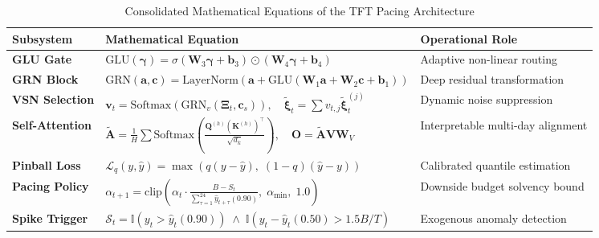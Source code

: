 \documentclass[11pt,a4paper]{article}
\begin{document}
\begin{table}[h!]
\centering
\caption{Consolidated Mathematical Equations of the TFT Pacing Architecture}
\label{tab:consolidated_eqs}
\small
\begin{tabular}{lll}
\toprule
\textbf{Subsystem} & \textbf{Mathematical Equation} & \textbf{Operational Role} \\
\midrule
\textbf{GLU Gate} & $\mathrm{GLU}(\boldsymbol{\gamma}) = \sigma(\mathbf{W}_3 \boldsymbol{\gamma} + \mathbf{b}_3) \odot (\mathbf{W}_4 \boldsymbol{\gamma} + \mathbf{b}_4)$ & Adaptive non-linear routing \\
\textbf{GRN Block} & $\mathrm{GRN}(\mathbf{a}, \mathbf{c}) = \mathrm{LayerNorm}(\mathbf{a} + \mathrm{GLU}(\mathbf{W}_1\mathbf{a} + \mathbf{W}_2\mathbf{c} + \mathbf{b}_1))$ & Deep residual transformation \\
\textbf{VSN Selection} & $\mathbf{v}_t = \mathrm{Softmax}(\mathrm{GRN}_v(\mathbf{\Xi}_t, \mathbf{c}_s)), \quad \tilde{\boldsymbol{\xi}}_t = \sum v_{t, j} \tilde{\boldsymbol{\xi}}_t^{(j)}$ & Dynamic noise suppression \\
\textbf{Self-Attention} & $\tilde{\mathbf{A}} = \frac{1}{H}\sum \mathrm{Softmax}\left(\frac{\mathbf{Q}^{(h)} (\mathbf{K}^{(h)})^\top}{\sqrt{d_k}}\right), \quad \mathbf{O} = \tilde{\mathbf{A}} \mathbf{V} \mathbf{W}_V$ & Interpretable multi-day alignment \\
\textbf{Pinball Loss} & $\mathcal{L}_q(y, \hat{y}) = \max(q(y-\hat{y}), \; (1-q)(\hat{y}-y))$ & Calibrated quantile estimation \\
\textbf{Pacing Policy} & $\alpha_{t+1} = \text{clip}\left(\alpha_t \cdot \frac{B - S_t}{\sum_{\tau=1}^{24} \hat{y}_{t+\tau}(0.90)}, \; \alpha_{\min}, \; 1.0\right)$ & Downside budget solvency bound \\
\textbf{Spike Trigger} & $\mathcal{S}_t = \mathbb{I}(y_t > \hat{y}_t(0.90)) \;\land\; \mathbb{I}(y_t - \hat{y}_t(0.50) > 1.5 B/T)$ & Exogenous anomaly detection \\
\bottomrule
\end{tabular}
\end{table}
\end{document}
